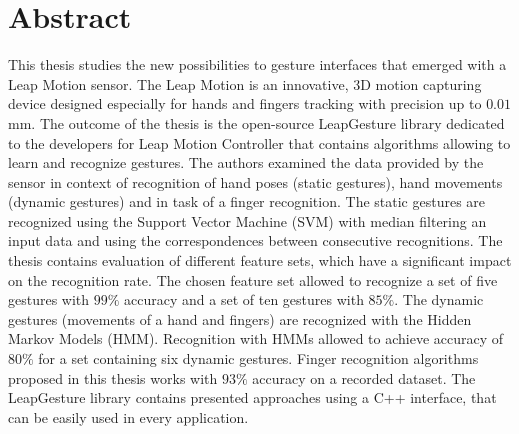 \chapter*{Abstract}
This thesis studies the new possibilities to gesture interfaces that emerged with a Leap Motion sensor.
The Leap Motion is an innovative, 3D motion capturing device designed especially for hands and fingers tracking with precision up to $0.01$mm.
The outcome of the thesis is the open-source LeapGesture library dedicated to the developers for Leap Motion Controller that contains algorithms allowing to learn and recognize gestures.
The authors examined the data provided by the sensor in context of recognition of hand poses (static gestures), hand movements (dynamic gestures) and in task of a finger recognition.
The static gestures are recognized using the Support Vector Machine (SVM) with median filtering an input data and using the correspondences between consecutive recognitions.
The thesis contains evaluation of different feature sets, which have a significant impact on the recognition rate.
The chosen feature set allowed to recognize a set of five gestures with $99\%$ accuracy and a set of ten gestures with $85\%$.
The dynamic gestures (movements of a hand and fingers) are recognized with the Hidden Markov Models (HMM). 
Recognition with HMMs allowed to achieve accuracy of $80\%$ for a set containing six dynamic gestures.
Finger recognition algorithms proposed in this thesis works with $93\%$ accuracy on a recorded dataset.
The LeapGesture library contains presented approaches using a C++ interface, that can be easily used in every application.